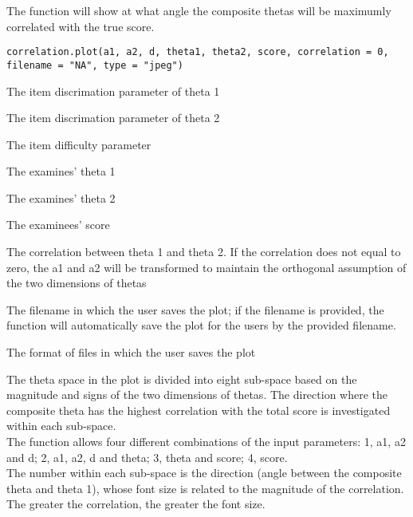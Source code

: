 \begin{Description}\relax
The function will show at what angle the composite thetas will be maximumly correlated with the true score.
\end{Description}
\begin{Usage}
\begin{verbatim}
correlation.plot(a1, a2, d, theta1, theta2, score, correlation = 0, filename = "NA", type = "jpeg")
\end{verbatim}
\end{Usage}
\begin{Arguments}
\begin{ldescription}
\item[\code{a1}] The item discrimation parameter of theta 1 
\item[\code{a2}] The item discrimation parameter of theta 2
\item[\code{d}] The item difficulty parameter
\item[\code{theta1}] The examines' theta 1 
\item[\code{theta2}] The examines' theta 2 
\item[\code{score}] The examinees' score 
\item[\code{correlation}] The correlation between theta 1 and theta 2. If the correlation does not equal to zero, the a1 and a2 will be transformed to maintain the orthogonal assumption of the two dimensions of thetas 
\item[\code{filename}] The filename in which the user saves the plot; if the filename is provided, the function will automatically save the plot for the users by the provided filename. 
\item[\code{type}] The format of files in which the user saves the plot 
\end{ldescription}
\end{Arguments}
\begin{Details}\relax
The theta space in the plot is divided into eight sub-space based on the magnitude and signs of the two dimensions of thetas. The direction where the composite theta has the highest correlation with the total score is investigated within each sub-space. \\
The function allows four different combinations of the input parameters: 1, a1, a2 and d; 2, a1, a2, d and theta; 3, theta and score; 4, score. \\
The number within each sub-space is the direction (angle between the composite theta and theta 1), whose font size is related to the magnitude of the correlation. The greater the correlation, the greater the font size.
\end{Details}
